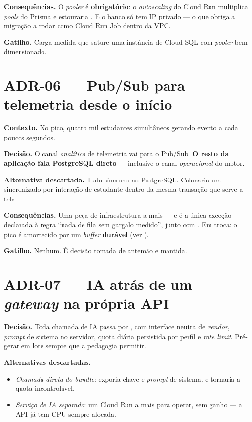 \textbf{Consequências.} O \emph{pooler} é \textbf{obrigatório}: o
\emph{autoscaling} do Cloud Run multiplica \emph{pools} do Prisma e estouraria
. E o banco só tem IP privado --- o que obriga a migração a
rodar como Cloud Run Job dentro da VPC.

\textbf{Gatilho.} Carga medida que sature uma instância de Cloud SQL com
\emph{pooler} bem dimensionado.

\section{ADR-06 --- Pub/Sub para telemetria desde o início}

\textbf{Contexto.} No pico, quatro mil estudantes simultâneos gerando evento a cada
poucos segundos.

\textbf{Decisão.} O canal \emph{analítico} de telemetria vai para o Pub/Sub.
\textbf{O resto da aplicação fala PostgreSQL direto} --- inclusive o canal
\emph{operacional} do motor.

\textbf{Alternativa descartada.} Tudo síncrono no PostgreSQL. Colocaria um
 sincronizado por interação de estudante dentro da mesma transação que
serve a tela.

\textbf{Consequências.} Uma peça de infraestrutura a mais --- e é a única exceção
declarada à regra \enquote{nada de fila sem gargalo medido}, junto com
. Em troca: o pico é amortecido por um \emph{buffer} \textbf{durável}
(ver ).

\textbf{Gatilho.} Nenhum. É decisão tomada de antemão e mantida.

\section{ADR-07 --- IA atrás de um \emph{gateway} na própria API}

\textbf{Decisão.} Toda chamada de IA passa por , com
interface neutra de \emph{vendor}, \emph{prompt} de sistema no servidor, quota
diária persistida por perfil e \emph{rate limit}. Pré-gerar em lote sempre que a
pedagogia permitir.

\textbf{Alternativas descartadas.}
\begin{itemize}
  \item \emph{Chamada direta do \emph{bundle}}: exporia chave e \emph{prompt} de
    sistema, e tornaria a quota incontrolável.
  \item \emph{Serviço de IA separado}: um Cloud Run a mais para operar, sem
    ganho --- a API já tem CPU sempre alocada.
\end{itemize}

